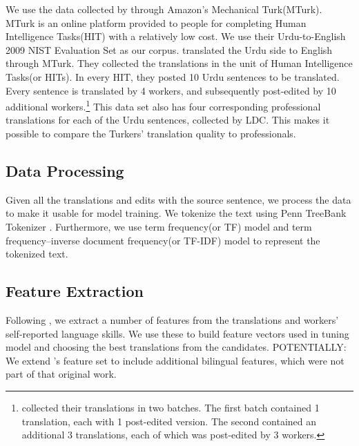 \documentclass[11pt]{article}
\begin{document}
We use the data collected by   through Amazon's Mechanical Turk(MTurk). MTurk is an online platform provided to people for completing Human Intelligence Tasks(HIT) with a relatively low cost. We use their Urdu-to-English 2009 NIST Evaluation Set as our corpus.    translated the Urdu side to English through MTurk. They collected the translations in the unit of Human Intelligence Tasks(or HITs). In every HIT, they posted 10 Urdu sentences to be translated. Every sentence is translated by 4 workers, and subsequently post-edited by 10 additional workers.\footnote{  collected their translations in two batches.  The first batch contained 1 translation, each with 1 post-edited  version.  The second contained an additional 3 translations, each of which was post-edited by 3 workers.}
This data set also has four corresponding professional translations for each  of the Urdu sentences, collected by LDC. This makes it possible to compare the Turkers' translation quality to professionals. 

\subsection{Data Processing}
Given all the translations and edits with the source sentence, we process the data to make it usable for model training. We tokenize  the text using Penn TreeBank Tokenizer \cite{marcus1993building}. Furthermore, we use term frequency(or TF) model and term frequency–inverse document frequency(or TF-IDF) model to represent the tokenized text. 
\subsection{Feature Extraction}
Following , we extract a number of features from the translations and workers' self-reported language skills.  We use these to build feature vectors used in tuning model and choosing the best translations from the candidates. 
POTENTIALLY: We extend 's feature set to include additional bilingual features, which were not part of that original work.
\end{document}
